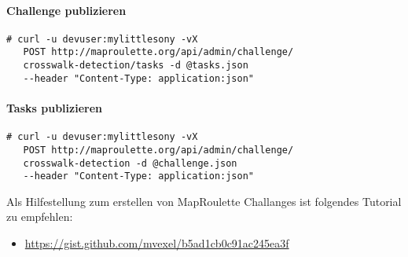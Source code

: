 \paragraph{Challenge publizieren}
\begin{lstlisting}[style=BashInputStyle]
 # curl -u devuser:mylittlesony -vX 
   POST http://maproulette.org/api/admin/challenge/
   crosswalk-detection/tasks -d @tasks.json 
   --header "Content-Type: application:json"
\end{lstlisting}

\paragraph{Tasks publizieren}
\begin{lstlisting}[style=BashInputStyle]
 # curl -u devuser:mylittlesony -vX 
   POST http://maproulette.org/api/admin/challenge/
   crosswalk-detection -d @challenge.json 
   --header "Content-Type: application:json"
\end{lstlisting}


Als Hilfestellung zum erstellen von MapRoulette Challanges ist folgendes Tutorial zu empfehlen:
\begin{itemize}
	\item \url{https://gist.github.com/mvexel/b5ad1cb0c91ac245ea3f}
\end{itemize}